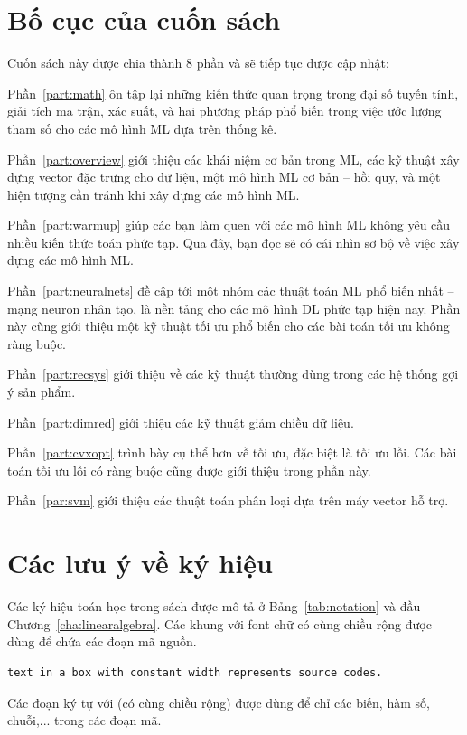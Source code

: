\section{Bố cục của cuốn sách}
Cuốn sách này được chia thành 8 phần và sẽ tiếp tục được cập nhật:

{Phần~\ref{part:math}} ôn tập lại những kiến thức quan trọng trong đại số tuyến
tính, giải tích ma trận, xác suất, và hai phương pháp phổ biến trong việc ước
lượng tham số cho các mô hình ML dựa trên thống kê.

Phần~\ref{part:overview} giới thiệu các khái niệm cơ bản trong ML, các kỹ thuật
xây dựng vector đặc trưng cho dữ liệu, một mô hình ML cơ bản -- hồi quy, và một hiện tượng cần tránh khi xây dựng các mô hình ML.

Phần~\ref{part:warmup} giúp các bạn làm quen với các mô hình ML không yêu cầu
nhiều kiến thức toán phức tạp. Qua đây, bạn đọc sẽ có cái nhìn sơ bộ về việc xây
dựng các mô hình ML.


Phần~\ref{part:neuralnets} đề cập tới một nhóm các thuật toán ML phổ biến nhất
-- mạng neuron nhân tạo, là nền tảng cho các mô hình DL phức tạp
hiện nay. Phần này cũng giới thiệu một kỹ thuật tối ưu phổ biến cho các bài toán
tối ưu không ràng buộc.

Phần~\ref{part:recsys} giới thiệu về các kỹ thuật thường dùng trong các hệ thống
gợi ý sản phẩm.

Phần~\ref{part:dimred} giới thiệu các kỹ thuật giảm chiều dữ liệu.

Phần~\ref{part:cvxopt} trình bày cụ thể hơn về tối ưu, đặc biệt là tối ưu lồi.
Các bài toán tối ưu lồi có ràng buộc cũng được giới thiệu trong phần này.

Phần~\ref{par:svm} giới thiệu các thuật toán phân loại dựa trên máy vector hỗ trợ.


\section{Các lưu ý về ký hiệu}
Các ký hiệu toán học trong sách được mô tả ở Bảng~\ref{tab:notation} và đầu
Chương~\ref{cha:linearalgebra}.
Các khung với font chữ có cùng chiều rộng được dùng để chứa các đoạn mã nguồn.
\begin{lstlisting}
text in a box with constant width represents source codes.
\end{lstlisting}
Các đoạn ký tự với  (có cùng chiều rộng)
được dùng để chỉ các biến, hàm số, chuỗi,...  trong các đoạn mã.


